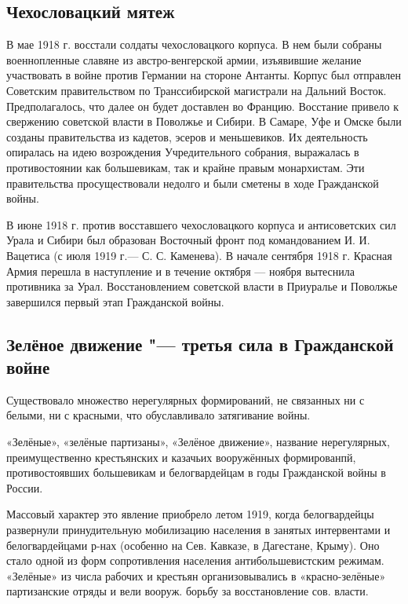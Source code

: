 \subsection{Чехословацкий мятеж}

В мае 1918 г. восстали солдаты чехословацкого корпуса. В нем были собраны
военнопленные славяне из австро-венгерской армии, изъявившие желание участвовать в войне
против Германии на стороне Антанты. Корпус был отправлен Советским правительством по
Транссибирской магистрали на Дальний Восток. Предполагалось, что далее он будет доставлен
во Францию. Восстание привело к свержению советской власти в Поволжье и Сибири. В
Самаре, Уфе и Омске были созданы правительства из кадетов, эсеров и меньшевиков. Их
деятельность опиралась на идею возрождения Учредительного собрания, выражалась в
противостоянии как большевикам, так и крайне правым монархистам. Эти правительства
просуществовали недолго и были сметены в ходе Гражданской войны.

В июне 1918 г. против восставшего чехословацкого корпуса и антисоветских сил Урала и
Сибири был образован Восточный фронт под командованием И. И. Вацетиса (с июля 1919 г.—
С. С. Каменева). В начале сентября 1918 г. Красная Армия перешла в наступление и в течение
октября — ноября вытеснила противника за Урал. Восстановлением советской власти в
Приуралье и Поволжье завершился первый этап Гражданской войны.

\subsection{Зелёное движение "--- третья сила в Гражданской войне}

Существовало множество нерегулярных формирований, не связанных ни с белыми, ни с красными, что обуславливало затягивание войны.

«Зелёные», «зелёные партизаны», «Зелёное движение», название нерегулярных, преимущественно крестьянских и казачьих вооружённых формированпй, противостоявших большевикам и белогвардейцам в годы Гражданской войны в России.

Массовый характер это явление приобрело летом 1919, когда белогвардейцы развернули принудительную мобилизацию населения в занятых интервентами и белогвардейцами р-нах (особенно на Сев. Кавказе, в Дагестане, Крыму).
Оно стало одной из форм сопротивления населения антибольшевистским режимам.
«Зелёные» из числа рабочих и крестьян организовывались в «красно-зелёные» партизанские отряды и вели вооруж. борьбу за восстановление сов. власти.

